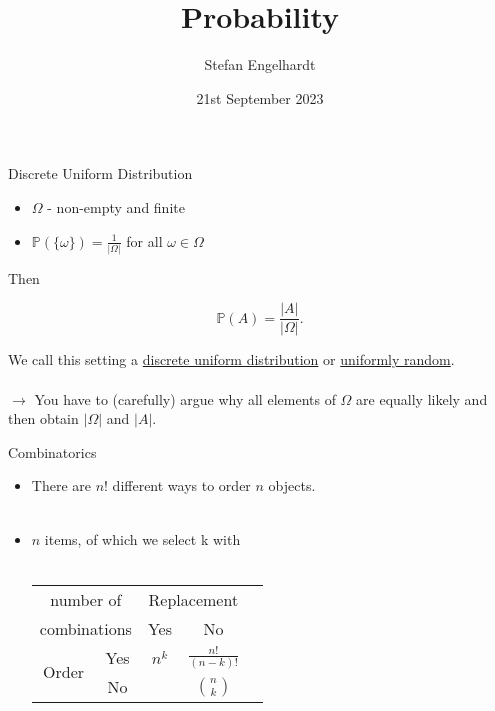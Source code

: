 \documentclass[11pt,pdf,ngerman,UKenglish,handout]{beamer}%
\title{Probability}
\author{Stefan Engelhardt}
\date{21st September 2023}%
\newcommand{\IP}{\mathbb{P}}
\newcommand{\1}{\mathbb{1}}
\theoremstyle{thm}
\theoremstyle{def}
\begin{document}
\begin{frame}
\titlepage
\end{frame}
\logo{}



\begin{frame}{Discrete Uniform Distribution}
\begin{itemize}
\item $\Omega$ - non-empty and finite
\item $\IP(\{\omega\})= \frac{1}{\vert \Omega \vert }$ for all $\omega \in \Omega$
\end{itemize}
Then
\begin{block}{}
$$ \IP(A) = \frac{ \vert A \vert }{ \vert \Omega \vert }. $$
\end{block}
We call this setting a \underline{discrete uniform distribution} or \underline{uniformly random}.
\\ \ \\
$\to$ You have to (carefully) argue why all elements of $\Omega$ are equally likely and then obtain $\vert \Omega \vert$ and $\vert A \vert$.
\end{frame}

\begin{frame}{Combinatorics}
\begin{itemize}
\item There are $n!$ different ways to order $n$ objects.
\\ \ \\
\item $n$ items, of which we select k with
\\ \ \\
\begin{center}
{\renewcommand{\arraystretch}{1.5}
\begin{tabular}{|c|c|c|c|c|}
\hline
\multicolumn{2}{|c|}{ number of } & \multicolumn{2}{c|}{Replacement} \\ \cline{3-4}
\multicolumn{2}{|c|}{ combinations } & Yes & No \\ \hline
\multirow{2}{*}{Order} & Yes & $n^k$ & $\frac{n!}{(n-k)!}$ \\[1pt] \cline{2-4}
& No & \color{gray}{$ {n+k-1}\choose{n}$} & $n\choose {k}$ \\ \hline
\end{tabular}
}
\end{center}
\end{itemize}
\end{frame}
\end{document}
